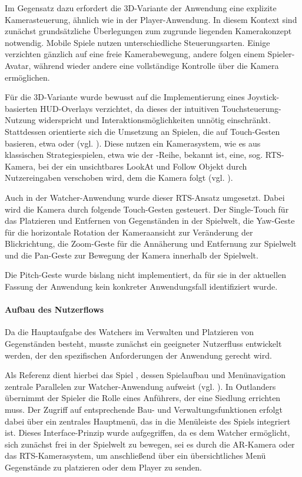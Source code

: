  Im Gegensatz dazu erfordert die \ac{3D}-Variante der Anwendung eine explizite Kamerasteuerung, ähnlich wie in der Player-Anwendung. In diesem Kontext sind zunächst grundsätzliche Überlegungen zum zugrunde liegenden Kamerakonzept notwendig. Mobile Spiele nutzen unterschiedliche Steuerungsarten. Einige verzichten gänzlich auf eine freie Kamerabewegung, andere folgen einem Spieler-Avatar, während wieder andere eine vollständige Kontrolle über die Kamera ermöglichen.

 Für die \ac{3D}-Variante wurde bewusst auf die Implementierung eines Joystick-basierten \ac{HUD}-Overlays verzichtet, da dieses der intuitiven Touchsteuerung-Nutzung widerspricht und Interaktionsmöglichkeiten unnötig einschränkt. Stattdessen orientierte sich die Umsetzung an Spielen, die auf Touch-Gesten basieren, etwa  oder  (vgl. \citealp{arts_sims_2017, pomelo_games_outlanders_2019}). Diese nutzen ein Kamerasystem, wie es aus klassischen Strategiespielen, etwa wie der -Reihe, bekannt ist, eine, sog. \ac{RTS}-Kamera, bei der ein unsichtbares LookAt und Follow Objekt durch Nutzereingaben verschoben wird, dem die Kamera folgt (vgl. \citealp{noauthor_ubisoft_nodate}). 

Auch in der Watcher-Anwendung wurde dieser \ac{RTS}-Ansatz umgesetzt. Dabei wird die Kamera durch folgende Touch-Gesten gesteuert.
Der Single-Touch für das Platzieren und Entfernen von Gegenständen in der Spielwelt, die Yaw-Geste für die horizontale Rotation der Kameraansicht zur Veränderung der Blickrichtung, die Zoom-Geste für die Annäherung und Entfernung zur Spielwelt und die Pan-Geste zur Bewegung der Kamera innerhalb der Spielwelt.

Die Pitch-Geste wurde bislang nicht implementiert, da für sie in der aktuellen Fassung der Anwendung kein konkreter Anwendungsfall identifiziert wurde.

\paragraph{Aufbau des Nutzerflows}

Da die Hauptaufgabe des Watchers im Verwalten und Platzieren von Gegenständen besteht, musste zunächst ein geeigneter Nutzerfluss entwickelt werden, der den spezifischen Anforderungen der Anwendung gerecht wird. 

Als Referenz dient hierbei das Spiel , dessen Spielaufbau und Menünavigation zentrale Parallelen zur Watcher-Anwendung aufweist (vgl. \citealp{pomelo_games_outlanders_2019}). In Outlanders übernimmt der Spieler die Rolle eines Anführers, der eine Siedlung errichten muss. Der Zugriff auf entsprechende Bau- und Verwaltungsfunktionen erfolgt dabei über ein zentrales Hauptmenü, das in die Menüleiste des Spiels integriert ist. Dieses Interface-Prinzip wurde aufgegriffen, da es dem Watcher ermöglicht, sich zunächst frei in der Spielwelt zu bewegen, sei es durch die \ac{AR}-Kamera oder das \ac{RTS}-Kamerasystem, um anschließend über ein übersichtliches Menü Gegenstände zu platzieren oder dem Player zu senden.

